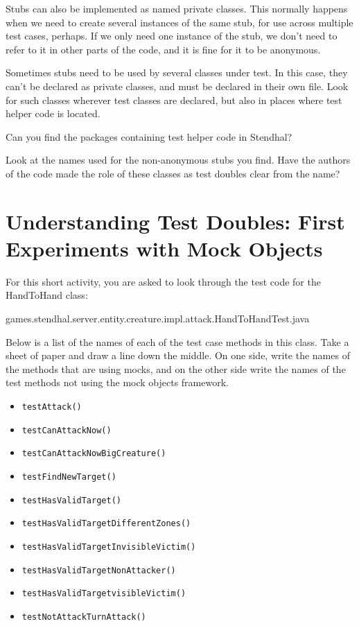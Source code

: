 \documentclass[
]{book}
\newenvironment{Shaded}{\begin{snugshade}}{\end{snugshade}}
\newcommand{\FunctionTok}[1]{\textcolor[rgb]{0.00,0.00,0.00}{#1}}
\newcommand{\NormalTok}[1]{#1}
\providecommand{\tightlist}{%
  \setlength{\itemsep}{0pt}\setlength{\parskip}{0pt}}
\begin{document}
Stubs can also be implemented as named private classes. This normally happens when we need to create several instances of the same stub, for use across multiple test cases, perhaps. If we only need one instance of the stub, we don't need to refer to it in other parts of the code, and it is fine for it to be anonymous.

Sometimes stubs need to be used by several classes under test. In this case, they can't be declared as private classes, and must be declared in their own file. Look for such classes wherever test classes are declared, but also in places where test helper code is located.

Can you find the packages containing test helper code in Stendhal?

Look at the names used for the non-anonymous stubs you find. Have the authors of the code made the role of these classes as test doubles clear from the name?

\hypertarget{mockobjects}{%
\section{Understanding Test Doubles: First Experiments with Mock Objects}\label{mockobjects}}

For this short activity, you are asked to look through the test code for the HandToHand class:

\begin{Shaded}
\begin{Highlighting}[]
\NormalTok{games.}\FunctionTok{stendhal}\NormalTok{.}\FunctionTok{server}\NormalTok{.}\FunctionTok{entity}\NormalTok{.}\FunctionTok{creature}\NormalTok{.}\FunctionTok{impl}\NormalTok{.}\FunctionTok{attack}\NormalTok{.}\FunctionTok{HandToHandTest}\NormalTok{.}\FunctionTok{java}
\end{Highlighting}
\end{Shaded}

Below is a list of the names of each of the test case methods in this class. Take a sheet of paper and draw a line down the middle. On one side, write the names of the methods that are using mocks, and on the other side write the names of the test methods not using the mock objects framework.

\begin{itemize}
\tightlist
\item
  \texttt{testAttack()}
\item
  \texttt{testCanAttackNow()}
\item
  \texttt{testCanAttackNowBigCreature()}
\item
  \texttt{testFindNewTarget()}
\item
  \texttt{testHasValidTarget()}
\item
  \texttt{testHasValidTargetDifferentZones()}
\item
  \texttt{testHasValidTargetInvisibleVictim()}
\item
  \texttt{testHasValidTargetNonAttacker()}
\item
  \texttt{testHasValidTargetvisibleVictim()}
\item
  \texttt{testNotAttackTurnAttack()}
\end{itemize}
\end{document}
